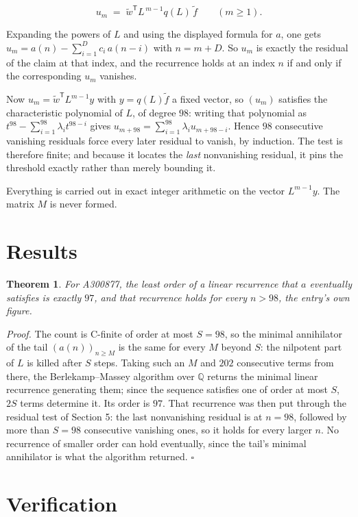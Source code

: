 \documentclass[11pt]{article}
\newtheorem{theorem}{Theorem}
\theoremstyle{definition}
\begin{document}
\[u_m \;=\; \tilde w^{\mathsf T} L^{\,m-1} q(L)\,\tilde f \qquad (m \ge 1).\]

Expanding the powers of $L$ and using the displayed formula for $a$, one gets $u_m = a(n) - \sum_{i=1}^{D} c_i\,a(n-i)$ with $n = m + D$. So $u_m$ is exactly the residual of the claim at that index, and the recurrence holds at an index $n$ if and only if the corresponding $u_m$ vanishes.

Now $u_m = \tilde w^{\mathsf T} L^{m-1} y$ with $y = q(L)\tilde f$ a fixed vector, so $(u_m)$ satisfies the characteristic polynomial of $L$, of degree $98$: writing that polynomial as $t^{98} - \sum_{i=1}^{98} \lambda_i t^{98-i}$ gives $u_{m+98} = \sum_{i=1}^{98} \lambda_i u_{m+98-i}$. Hence $98$ consecutive vanishing residuals force every later residual to vanish, by induction. The test is therefore finite; and because it locates the {\itshape last} nonvanishing residual, it pins the threshold exactly rather than merely bounding it.

Everything is carried out in exact integer arithmetic on the vector $L^{m-1}y$. The matrix $M$ is never formed.

\section{Results}

\begin{theorem} For A300877, the least order of a linear recurrence that $a$ eventually satisfies is exactly $97$, and that recurrence holds for every $n > 98$, the entry's own figure.\end{theorem}

{\itshape Proof.} The count is C-finite of order at most $S = 98$, so the minimal annihilator of the tail $(a(n))_{n \ge M}$ is the same for every $M$ beyond $S$: the nilpotent part of $L$ is killed after $S$ steps. Taking such an $M$ and $202$ consecutive terms from there, the Berlekamp--Massey algorithm over $\mathbb{Q}$ returns the minimal linear recurrence generating them; since the sequence satisfies one of order at most $S$, $2S$ terms determine it. Its order is $97$. That recurrence was then put through the residual test of Section 5: the last nonvanishing residual is at $n = 98$, followed by more than $S = 98$ consecutive vanishing ones, so it holds for every larger $n$. No recurrence of smaller order can hold eventually, since the tail's minimal annihilator is what the algorithm returned. $\square$

\section{Verification}
\end{document}
